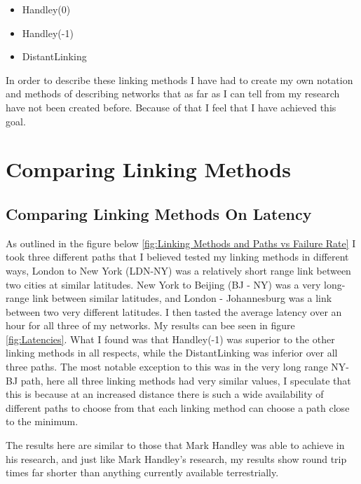 \documentclass[12pt]{report}
\begin{document}
\begin{itemize}
\item Handley(0)
\item Handley(-1)
\item DistantLinking
\end{itemize}

In order to describe these linking methods I have had to create my own notation and methods of describing networks that as far as I can tell from my research have not been created before. Because of that I feel that I have achieved this goal.

\section{Comparing Linking Methods}

\subsection{Comparing Linking Methods On Latency}

As outlined in the figure below \ref{fig:Linking Methods and Paths vs Failure Rate} I took three different paths that I believed tested my linking methods in different ways, London to New York (LDN-NY) was a relatively short range link between two cities at similar latitudes. New York to Beijing (BJ - NY) was a very long-range link between similar latitudes, and London - Johannesburg was a link between two very different latitudes. I then tasted the average latency over an hour for all three of my networks. My results can bee seen in figure \ref{fig:Latencies}. What I found was that Handley(-1) was superior to the other linking methods in all respects, while the DistantLinking was inferior over all three paths. The most notable exception to this was in the very long range NY-BJ path, here all three linking methods had very similar values, I speculate that this is because at an increased distance there is such a wide availability of different paths to choose from that each linking method can choose a path close to the minimum.

The results here are similar to those that Mark Handley was able to achieve in his research, and just like Mark Handley's research, my results show round trip times far shorter than anything currently available terrestrially. 
\end{document}
